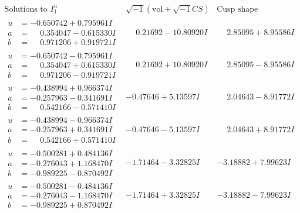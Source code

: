 \documentclass[1p]{elsarticle_modified}
\theoremstyle{definition}
\newcommand{\I}{\sqrt{-1}}
\begin{document}
$$\begin{array}{c|c|c}  
\text{Solutions to }I^u_{1}& \I (\text{vol} + \sqrt{-1}CS) & \text{Cusp shape}\\
 \hline 
\begin{aligned}
u &= -0.650742 + 0.795961 I \\
a &= \phantom{-}0.354047 - 0.615330 I \\
b &= \phantom{-}0.971206 + 0.919721 I\end{aligned}
 & \phantom{-}0.21692 - 10.80920 I & \phantom{-}2.85095 + 8.95586 I \\ \hline\begin{aligned}
u &= -0.650742 - 0.795961 I \\
a &= \phantom{-}0.354047 + 0.615330 I \\
b &= \phantom{-}0.971206 - 0.919721 I\end{aligned}
 & \phantom{-}0.21692 + 10.80920 I & \phantom{-}2.85095 - 8.95586 I \\ \hline\begin{aligned}
u &= -0.438994 + 0.966374 I \\
a &= -0.257963 - 0.341691 I \\
b &= \phantom{-}0.542166 - 0.571410 I\end{aligned}
 & -0.47646 + 5.13597 I & \phantom{-}2.04643 - 8.91772 I \\ \hline\begin{aligned}
u &= -0.438994 - 0.966374 I \\
a &= -0.257963 + 0.341691 I \\
b &= \phantom{-}0.542166 + 0.571410 I\end{aligned}
 & -0.47646 - 5.13597 I & \phantom{-}2.04643 + 8.91772 I \\ \hline\begin{aligned}
u &= -0.500281 + 0.484136 I \\
a &= -0.276043 + 1.168470 I \\
b &= -0.989225 - 0.870492 I\end{aligned}
 & -1.71464 - 3.32825 I & -3.18882 + 7.99623 I \\ \hline\begin{aligned}
u &= -0.500281 - 0.484136 I \\
a &= -0.276043 - 1.168470 I \\
b &= -0.989225 + 0.870492 I\end{aligned}
 & -1.71464 + 3.32825 I & -3.18882 - 7.99623 I \\ \hline\begin{aligned}

\end{aligned}
\end{array}$$
\end{document}
